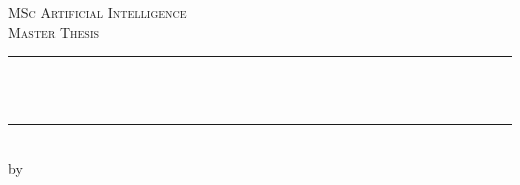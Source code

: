 \documentclass[12pt]{report}
\newcommand{\red}[1]{{\color{red}{#1}}}
\begin{document}
\begin{titlepage}



\newcommand{\HRule}{\rule{\linewidth}{0.5mm}} %

\center %

 





\textsc{\Large MSc Artificial Intelligence}\\[0.2cm]

\textsc{\Large Master Thesis}\\[0.5cm] 








\HRule \\[0.4cm]

{ \huge \bfseries \red{Your Title Here}}\\[0.4cm] %

\HRule \\[0.5cm]

 






by\\[0.2cm]

\textsc{\Large \red{Your Name}}\\[0.2cm] %

\red{student number}\\[1cm]







\end{titlepage}
\end{document}
